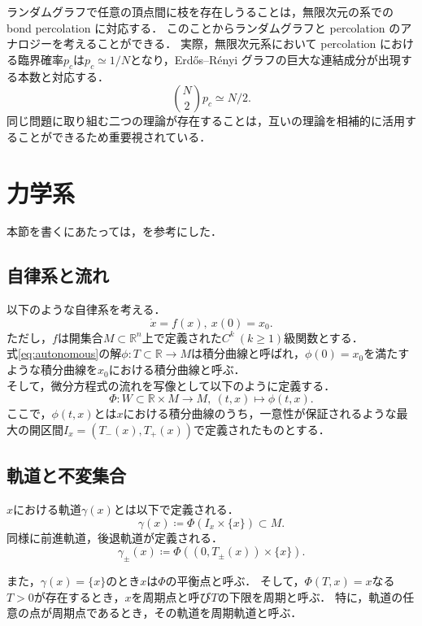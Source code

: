 \documentclass[../main]{subfiles}
\begin{document}
ランダムグラフで任意の頂点間に枝を存在しうることは，無限次元の系での bond percolation に対応する．
このことからランダムグラフと percolation のアナロジーを考えることができる．
実際，無限次元系において percolation における臨界確率$p_c$は$p_c\simeq 1/N$となり，Erdős–Rényi グラフの巨大な連結成分が出現する本数と対応する．
\begin{equation}
    \binom{N}{2}p_c\simeq N/2.
\end{equation}
同じ問題に取り組む二つの理論が存在することは，互いの理論を相補的に活用することができるため重要視されている．
\section{力学系}
本節を書くにあたっては，\cite{teschlordinary,Ciesielski+2012+2110+2128}を参考にした．
\subsection{自律系と流れ}
以下のような自律系を考える．
\begin{equation}
    \label{eq:autonomous}
    \dot{x}=f(x),\ x(0)=x_0.
\end{equation}
ただし，$f$は開集合$M\subset \mathbb{R}^n$上で定義された$C^k\ (k\geq 1)$級関数とする．\\
式\eqref{eq:autonomous}の解$\phi:T\subset \mathbb{R}\to M$は積分曲線と呼ばれ，$\phi(0)=x_0$を満たすような積分曲線を$x_0$における積分曲線と呼ぶ．\\
そして，微分方程式の流れを写像として以下のように定義する．
\begin{equation}
    \Phi:W\subset\mathbb{R}\times M\to M,\ (t,x)\mapsto \phi(t,x).
\end{equation}
ここで，$\phi(t,x)$とは$x$における積分曲線のうち，一意性が保証されるような最大の開区間$I_x=(T_-(x),T_+(x))$で定義されたものとする．
\subsection{軌道と不変集合}
$x$における軌道$\gamma(x)$とは以下で定義される．
\begin{equation}
    \gamma(x)\coloneqq\Phi(I_x\times \{x\})\subset M.
\end{equation}
同様に前進軌道，後退軌道が定義される．
\begin{equation}
    \gamma_\pm(x)\coloneqq\Phi((0,T_\pm (x))\times \{x\}).
\end{equation}

また，$\gamma(x)=\{x\}$のとき$x$は$\Phi$の平衡点と呼ぶ．
そして，$\Phi(T,x)=x$なる$T>0$が存在するとき，$x$を周期点と呼び$T$の下限を周期と呼ぶ．
特に，軌道の任意の点が周期点であるとき，その軌道を周期軌道と呼ぶ．
\end{document}
